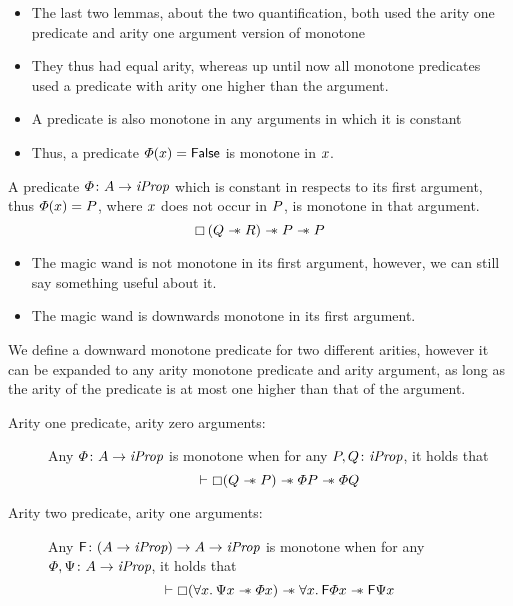 \documentclass[thesis.tex]{subfiles}
\begin{document}
\begin{itemize}
    \item The last two lemmas, about the two quantification, both used the arity one predicate and arity one argument version of monotone
    \item They thus had equal arity, whereas up until now all monotone predicates used a predicate with arity one higher than the argument.
\end{itemize}
\begin{itemize}
    \item A predicate is also monotone in any arguments in which it is constant
    \item Thus, a predicate $\varPhi(x) = \textsf{\upshape False}$ is monotone in $x$.
\end{itemize}
\begin{lemma}
    \label{lem:constmono}
    A predicate $\varPhi\colon A \to \textit{iProp}$ which is constant in respects to its first argument, thus $\varPhi(x) = P$, where $x$ does not occur in $P$, is monotone in that argument.
    \[ \mathop{\boxempty}{(Q \mathrel{-\!\!\ast} R)} \mathrel{-\!\!\ast} P \mathrel{-\!\!\ast} P \]
\end{lemma}
\begin{itemize}
    \item The magic wand is not monotone in its first argument, however, we can still say something useful about it.
    \item The magic wand is downwards monotone in its first argument.
\end{itemize}
\begin{definition}
    We define a downward monotone predicate for two different arities, however it can be expanded to any arity monotone predicate and arity argument, as long as the arity of the predicate is at most one higher than that of the argument.
    \begin{description}
        \item[Arity one predicate, arity zero arguments:] Any $\varPhi\colon A \to \textit{iProp}$ is monotone when for any $P, Q\colon \textit{iProp}$, it holds that
            \[\vdash \mathop{\boxempty}(Q \mathrel{-\!\!\ast} P) \mathrel{-\!\!\ast} \varPhi P \mathrel{-\!\!\ast} \varPhi Q\]
        \item[Arity two predicate, arity one arguments:] Any $\textsf{\upshape F}\colon (A \to \textit{iProp}) \to  A \to \textit{iProp}$ is monotone when for any $\varPhi, \Psi\colon A \to \textit{iProp}$, it holds that
            \[\proves \always(\All \var. \predB\var \wand \pred\var) \wand \All \var. \hopred\pred\var \wand \hopred\predB\var\]
    \end{description}
\end{definition}
\end{document}
